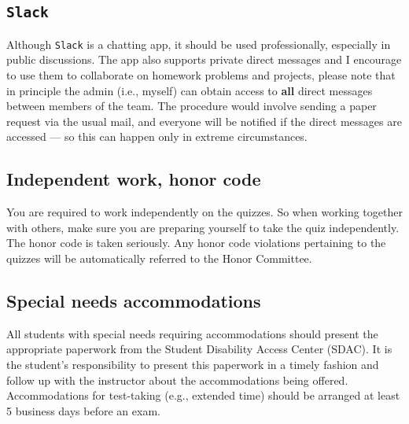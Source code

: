 \documentclass[oneside,11pt]{amsart}
\begin{document}
\subsection{\texttt{Slack}}

Although \texttt{Slack} is a chatting app,
it should be used professionally, especially in public discussions.
The app also supports private direct messages and I encourage
to use them to collaborate on homework problems and projects, please
note that in principle the admin (i.e., myself) can obtain access to 
\textbf{all} direct messages between members of the team. The procedure would involve sending a 
paper request via the usual mail, and everyone will be notified if the direct messages are accessed ---
so this can happen only in extreme circumstances.

\subsection{Independent work, honor code}
You are required to work independently on the quizzes. So when working together with others, make sure you are preparing yourself to take the quiz independently.
The honor code is taken seriously. Any honor code violations pertaining to the quizzes will be automatically referred to the Honor Committee.

\subsection{Special needs accommodations}
All students with special needs requiring accommodations should present the appropriate paperwork from the Student Disability Access Center (SDAC). It is the student's responsibility to present this paperwork in a timely fashion and follow up with the instructor about the accommodations being offered. Accommodations for test-taking (e.g., extended time) should be arranged at least 5 business days before an exam.
\end{document}
